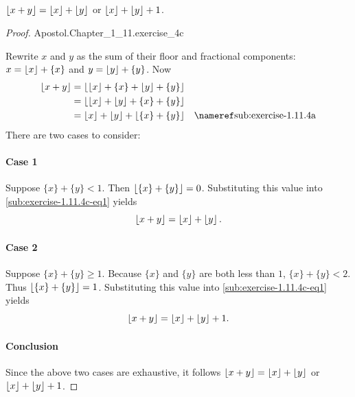 \documentclass{report}
\begin{document}
\subsection{}%
\label{sub:exercise-1.11.4c}

$\left\lfloor x + y\right\rfloor = \left\lfloor x\right\rfloor + \left\lfloor y\right\rfloor$ or $\left\lfloor x\right\rfloor + \left\lfloor y\right\rfloor + 1$.

\begin{proof}

    {Apostol.Chapter\_1\_11.exercise\_4c}

  Rewrite $x$ and $y$ as the sum of their floor and fractional components:
    $x = \left\lfloor x\right\rfloor + \{x\}$ and $y = \left\lfloor y\right\rfloor + \{y\}$.
  Now
    \begin{align}
      \floor{x + y}
        & = \floor{\floor{x} + \{x\} + \floor{y} + \{y\}} \nonumber \\
        & = \floor{\floor{x} + \floor{y} + \{x\} + \{y\}} \nonumber \\
        & = \floor{x} + \floor{y} + \floor{\{x\} + \{y\}}
          & \textref{sub:exercise-1.11.4a} \label{sub:exercise-1.11.4c-eq1}
    \end{align}
  There are two cases to consider:

  \paragraph{Case 1}%

    Suppose $\{x\} + \{y\} < 1$.
    Then $\left\lfloor\{x\} + \{y\}\right\rfloor = 0$.
    Substituting this value into \eqref{sub:exercise-1.11.4c-eq1} yields
      $$\left\lfloor x + y\right\rfloor = \left\lfloor x\right\rfloor + \left\lfloor y\right\rfloor.$$

  \paragraph{Case 2}%

    Suppose $\{x\} + \{y\} \geq 1$.
    Because $\{x\}$ and $\{y\}$ are both less than $1$, $\{x\} + \{y\} < 2$.
    Thus $\left\lfloor\{x\} + \{y\}\right\rfloor = 1$.
    Substituting this value into \eqref{sub:exercise-1.11.4c-eq1} yields
      $$\left\lfloor x + y\right\rfloor = \left\lfloor x\right\rfloor + \left\lfloor y\right\rfloor + 1.$$

  \paragraph{Conclusion}%

    Since the above two cases are exhaustive, it follows
      $\left\lfloor x + y\right\rfloor = \left\lfloor x\right\rfloor + \left\lfloor y\right\rfloor$ or $\left\lfloor x\right\rfloor + \left\lfloor y\right\rfloor + 1$.

\end{proof}
\end{document}
